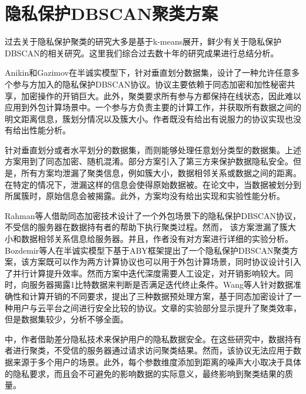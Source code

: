 \section{隐私保护DBSCAN聚类方案}
过去关于隐私保护聚类的研究大多是基于k-means展开，鲜少有关于隐私保护DBSCAN的相关研究。这里我们综合过去数十年的研究成果进行总结分析。

Anikin和Gazimov\cite{anikin2017privacy}在半诚实模型下，针对垂直划分数据集，设计了一种允许任意多个参与方加入的隐私保护DBSCAN协议。协议主要依赖于同态加密和加性秘密共享，加密操作的开销巨大。此外，聚类要求所有参与方都保持在线状态，因此难以应用到外包计算场景中。一个参与方负责主要的计算工作，并获取所有数据之间的明文距离信息，簇划分情况以及簇大小。作者既没有给出有说服力的协议实现也没有给出性能分析。

\cite{2006Privacy,jiang2008privacy,kumar2007privacy,liu2012privacy,xu2007protocols}针对垂直划分或者水平划分的数据集，而\cite{almutairi2018secure,liu2012privacy}则能够处理任意划分类型的数据集。上述方案用到了同态加密、随机混淆。部分方案引入了第三方来保护数据隐私安全。但是，所有方案均泄漏了聚类信息，例如簇大小，数据相邻关系\cite{almutairi2018secure,jiang2008privacy,kumar2007privacy,liu2012privacy,rahman2017towards}或数据之间的距离\cite{2006Privacy}。在特定的情况下，泄漏这样的信息会使得原始数据被\cite{kumar2007privacy,liu2012privacy}。在论文\cite{xu2007protocols}中，当数据被划分到所属簇时，原始信息会被揭露。此外，方案均没有给出实现和实验性能分析。

Rahman等人\cite{rahman2017towards}借助同态加密技术设计了一个外包场景下的隐私保护DBSCAN协议，不受信的服务器在数据持有者的帮助下执行聚类过程。然而， 该方案泄漏了簇大小和数据相邻关系信息给服务器。并且，作者没有对方案进行详细的实验分析。Bozdemir等人\cite{2021Privacy}在半诚实模型下基于ABY\cite{2015ABY}框架提出了一个隐私保护DBSCAN聚类方案，该方案既可以作为两方计算协议也可以用于外包计算场景，同时协议设计引入了并行计算提升效率。然而方案中迭代深度需要人工设定，对开销影响较大。同时，向服务器揭露1比特数据来判断是否满足迭代终止条件。Wang等人\cite{wang2022homomorphic}针对数据准确性和计算开销的不同要求，提出了三种数据预处理方案，基于同态加密设计了一种用户与云平台之间进行安全比较的协议。文章的实验部分显示提升了聚类效率，但是数据集较少，分析不够全面。

\cite{2018DP,2015A}中，作者借助差分隐私技术来保护用户的隐私数据安全。在这些研究中，数据持有者进行聚类，不受信的服务器通过请求访问聚类结果。然而，该协议无法应用于数据来源于多个用户的场景。此外，每个参数维度添加到距离的噪声大小取决于具体的隐私要求，而且会不可避免的影响数据的实际意义，最终影响到聚类结果的质量。


